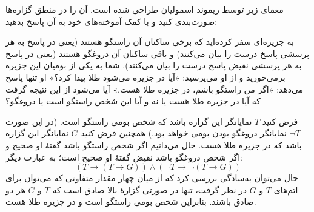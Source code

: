 معمای زیر توسط ریموند اسمولیان طراحی شده است. آن را در منطق گزاره‌ها صورت‌بندی کنید و با کمک آموخته‌های خود به آن پاسخ بدهید:

به جزیره‌ای سفر کرده‌اید که برخی ساکنان آن راستگو هستند (یعنی در پاسخ به هر پرسشی پاسخ درست را بیان می‌کنند) و باقی ساکنان آن دروغگو هستند (یعنی در پاسخ به هر پرسشی نقیض پاسخ درست را بیان می‌کنند). شما به یکی از بومیان این جزیره برمی‌خورید و از او می‌پرسید: «آیا در جزیره می‌شود طلا پیدا کرد؟» او تنها پاسخ می‌دهد: «اگر من راستگو باشم، در جزیره طلا هست.» آیا می‌شود از این نتیجه گرفت که آیا در جزیره طلا هست یا نه و آیا این شخص راستگو است یا دروغگو؟


\begin{ans}
  فرض کنید $T$ نمایانگر این گزاره باشد که شخص بومی راستگو است. (در این صورت $\neg T$ نمایانگر دروغگو بودن بومی خواهد بود.) همچنین فرض کنید $G$ نمایانگر این گزاره باشد که در جزیره طلا هست. حال می‌دانیم اگر شخص راستگو باشد گفتهٔ او صحیح و اگر شخص دروغگو باشد نقیض گفتهٔ او صحیح است؛ به عبارت دیگر:
  $$
  (T\to (T\to G))\wedge(\neg T\to \neg(T\to G))
  $$
  حال می‌توان به‌سادگی بررسی کرد که از میان چهار مقدار متفاوتی که می‌توان برای اتم‌های $T$ و $G$ در نظر گرفت، تنها در صورتی گزارهٔ بالا صادق است که $T$ و $G$ هر دو صادق باشند. بنابراین شخص بومی راستگو است و در جزیره طلا هست.
\end{ans}
